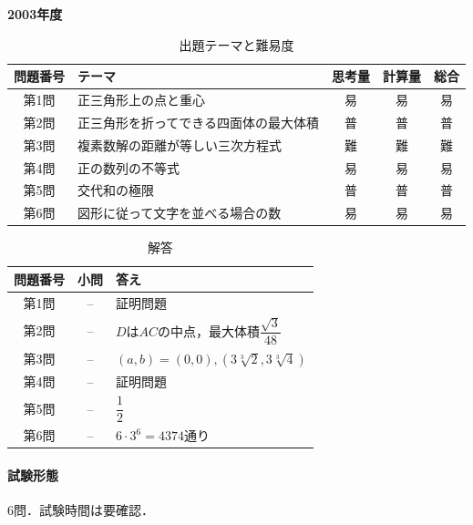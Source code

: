 \documentclass[../../main.tex]{subfiles}
\begin{document}
\begin{center}
  {\fontsize{48pt}{58pt}\selectfont \textbf{2003}\normalsize\textbf{年度}}
\end{center}

\begin{table}[htb]
  \centering
  \caption{出題テーマと難易度}
  \begin{tabular}{|c|p{6.2cm}|c|c|c|}
    \hline
    \textbf{問題番号} & \textbf{テーマ} & \textbf{思考量} & \textbf{計算量} & \textbf{総合} \\
    \hline
    第1問 & 正三角形上の点と重心 & 易 & 易 & 易 \\
    \hline
    第2問 & 正三角形を折ってできる四面体の最大体積 & 普 & 普 & 普 \\
    \hline
    第3問 & 複素数解の距離が等しい三次方程式 & 難 & 難 & 難 \\
    \hline
    第4問 & 正の数列の不等式 & 易 & 易 & 易 \\
    \hline
    第5問 & 交代和の極限 & 普 & 普 & 普 \\
    \hline
    第6問 & 図形に従って文字を並べる場合の数 & 易 & 易 & 易 \\
    \hline
  \end{tabular}
\end{table}

\begin{table}[htb]
  \centering
  \caption{解答}
  \renewcommand{\arraystretch}{1.4}
  \begin{tabular}{|c|c|p{9cm}|}
    \hline
    \textbf{問題番号} & \textbf{小問} & \textbf{答え} \\
    \hline
    第1問 & -- & 証明問題 \\
    \hline
    第2問 & -- & $D$は$AC$の中点，最大体積$\dfrac{\sqrt{3}}{48}$ \\
    \hline
    第3問 & -- & $(a,b)=(0,0),\left(3\sqrt[3]{2},3\sqrt[3]{4}\right)$ \\
    \hline
    第4問 & -- & 証明問題 \\
    \hline
    第5問 & -- & $\dfrac{1}{2}$ \\
    \hline
    第6問 & -- & $6\cdot3^6=4374$通り \\
    \hline
  \end{tabular}
\end{table}

\paragraph{試験形態}
6問．試験時間は要確認．
\end{document}
